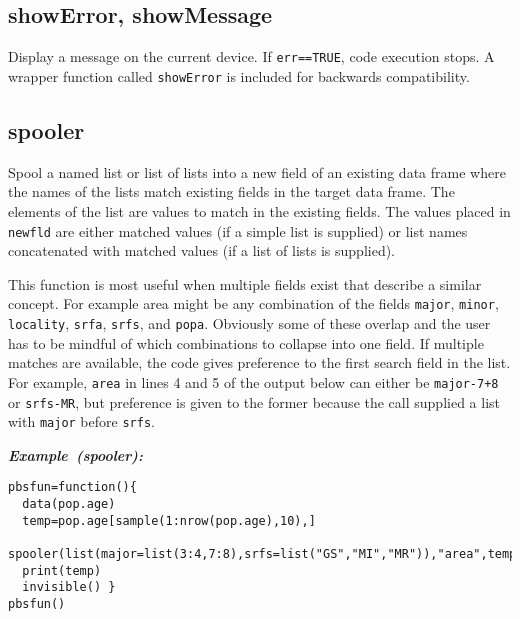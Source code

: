 \documentclass[letterpaper,12pt,fleqn]{article}
\def\tab{\hspace{0.5 in}}
\newcommand{\code}[1]{\small\texttt{#1}\normalsize}
\newcommand\example[1]{    %
	\textbf{\emph{Example~(#1):}}\\ \vspace{3 pt}
}
\begin{document}
\subsection {showError, showMessage}

\tab Display a message on the current device. If \code{err==TRUE}, code execution stops. A wrapper function called \code{showError} is included for backwards compatibility.

\subsection {spooler}

\tab Spool a named list or list of lists into a new field of an existing data frame where the names of the lists match existing fields in the target data frame. The elements of the list are values to match in the existing fields. The values placed in \code{newfld} are either matched values (if a simple list is supplied) or list names concatenated with matched values (if a list of lists is supplied).

\tab This function is most useful when multiple fields exist that describe a similar concept. For example area might be any combination of the fields \code{major}, \code{minor}, \code{locality}, \code{srfa}, \code{srfs}, and \code{popa}. Obviously some of these overlap and the user has to be mindful of which combinations to collapse into one field. If multiple matches are available, the code gives preference to the first search field in the list. For example, \code{area} in lines 4 and 5 of the output below can either be \code{major-7+8} or \code{srfs-MR}, but preference is given to the former because the call supplied a list with \code{major} before \code{srfs}.

\begin{examplebox}
\example{spooler}
\begin{Verbatim}[fontsize=\footnotesize]
pbsfun=function(){
  data(pop.age)
  temp=pop.age[sample(1:nrow(pop.age),10),]
  spooler(list(major=list(3:4,7:8),srfs=list("GS","MI","MR")),"area",temp)
  print(temp)
  invisible() }
pbsfun()
\end{Verbatim}
\end{examplebox}
\end{document}

